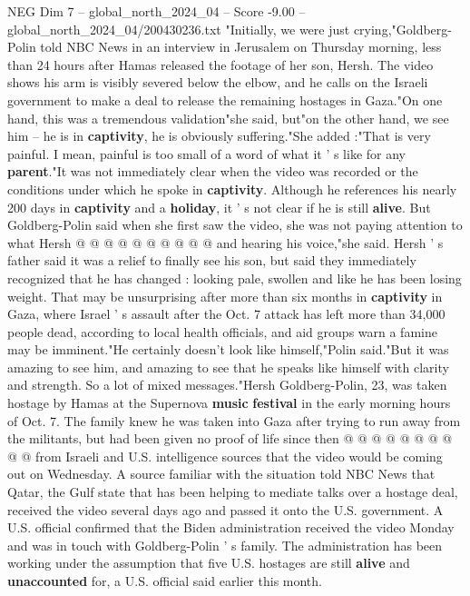 \begin{textsample}{NEG Dim 7 – global\_north\_2024\_04 – Score -9.00 – global\_north\_2024\_04/200430236.txt}  \label{ex:f7_neg_224}
"Initially, we were just crying,"Goldberg-Polin told NBC News in an interview in Jerusalem on Thursday morning, less than 24 hours after Hamas released the footage of her son, Hersh.
The video shows his arm is visibly severed below the elbow, and he calls on the Israeli government to make a deal to release the remaining hostages in Gaza."On one hand, this was a tremendous validation"she said, but"on the other hand, we see him -- he is in \textbf{captivity}, he is obviously suffering."She added :"That is very painful.
I mean, painful is too small of a word of what it ' s like for any \textbf{parent}."It was not immediately clear when the video was recorded or the conditions under which he spoke in \textbf{captivity}.
Although he references his nearly 200 days in \textbf{captivity} and a \textbf{holiday}, it ' s not clear if he is still \textbf{alive}.
But Goldberg-Polin said when she first saw the video, she was not paying attention to what Hersh @ @ @ @ @ @ @ @ @ @ and hearing his voice,"she said.
Hersh ' s father said it was a relief to finally see his son, but said they immediately recognized that he has changed : looking pale, swollen and like he has been losing weight.
That may be unsurprising after more than six months in \textbf{captivity} in Gaza, where Israel ' s assault after the Oct. 7 attack has left more than 34,000 people dead, according to local health officials, and aid groups warn a famine may be imminent."He certainly doesn't look like himself,"Polin said."But it was amazing to see him, and amazing to see that he speaks like himself with clarity and strength.
So a lot of mixed messages."Hersh Goldberg-Polin, 23, was taken hostage by Hamas at the Supernova \textbf{music} \textbf{festival} in the early morning hours of Oct. 7.
The family knew he was taken into Gaza after trying to run away from the militants, but had been given no proof of life since then @ @ @ @ @ @ @ @ @ @ from Israeli and U.S. intelligence sources that the video would be coming out on Wednesday.
A source familiar with the situation told NBC News that Qatar, the Gulf state that has been helping to mediate talks over a hostage deal, received the video several days ago and passed it onto the U.S. government.
A U.S. official confirmed that the Biden administration received the video Monday and was in touch with Goldberg-Polin ' s family.
The administration has been working under the assumption that five U.S. hostages are still \textbf{alive} and \textbf{unaccounted} for, a U.S. official said earlier this month.

\end{textsample}
